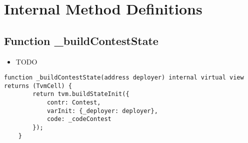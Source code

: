 \section{Internal Method Definitions}


\subsection{Function \_{}buildContestState}

\begin{itemize}
\item TODO
\end{itemize}

\begin{lstlisting}[firstnumber=16]
    function _buildContestState(address deployer) internal virtual view returns (TvmCell) {
        return tvm.buildStateInit({
            contr: Contest,
            varInit: {_deployer: deployer},
            code: _codeContest
        });
    }
\end{lstlisting}
